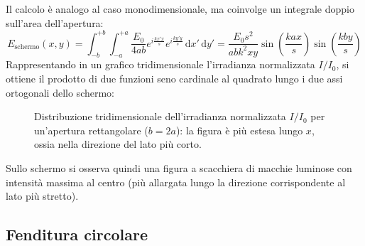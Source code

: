 \documentclass[openany,a4paper,12pt]{book}
\begin{document}
Il calcolo è analogo al caso monodimensionale, ma coinvolge un integrale doppio sull'area dell'apertura:
\begin{equation}
    E_{\text{schermo}}(x, y) = \int_{-b}^{+b} \int_{-a}^{+a} \frac{E_0}{4ab} e^{i\frac{k x' x}{s}} e^{i\frac{k y' y}{s}} \,\mathrm{d}x'\,\mathrm{d}y' = \frac{E_0 s^2}{a b k^2 x y} \sin\left(\frac{k a x}{s}\right) \sin\left(\frac{k b y}{s}\right)
\end{equation}
Rappresentando in un grafico tridimensionale l'irradianza normalizzata $I/I_0$, si ottiene il prodotto di due funzioni seno cardinale al quadrato lungo i due assi ortogonali dello schermo:


\begin{figure}[H]
    \centering
    \caption{Distribuzione tridimensionale dell'irradianza normalizzata $I/I_0$ per un'apertura rettangolare ($b = 2a$): la figura è più estesa lungo $x$, ossia nella direzione del lato più corto.}
\end{figure}

Sullo schermo si osserva quindi una figura a scacchiera di macchie luminose con intensità massima al centro (più allargata lungo la direzione corrispondente al lato più stretto).

\subsection*{Fenditura circolare}
\end{document}
